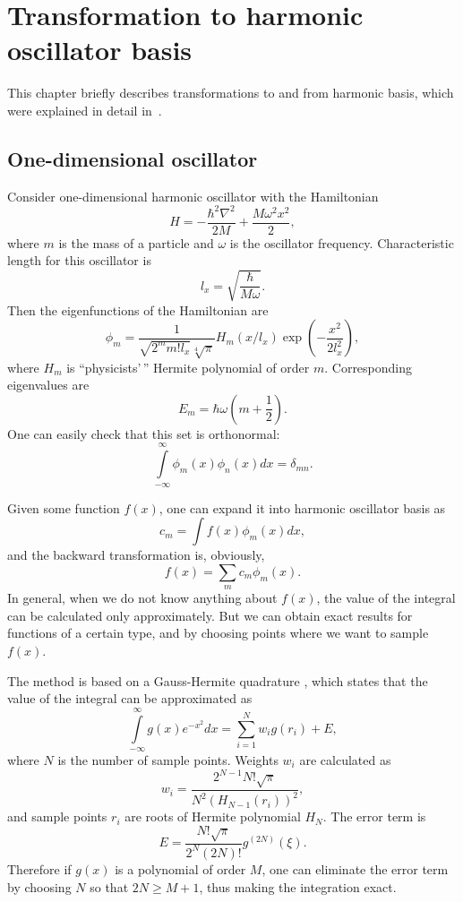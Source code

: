\chapter{Transformation to harmonic oscillator basis}
\label{cha:appendix:harmonic-transform}


This chapter briefly describes transformations to and from harmonic basis,
which were explained in detail in~\cite{Dion2003}.


\section{One-dimensional oscillator}

Consider one-dimensional harmonic oscillator with the Hamiltonian
\[
	H = -\frac{\hbar^2 \nabla^2}{2 M} + \frac{M \omega^2 x^2}{2},
\]
where $m$ is the mass of a particle and $\omega$ is the oscillator frequency.
Characteristic length for this oscillator is
\[
	l_x = \sqrt{\frac{\hbar}{M \omega}}.
\]
Then the eigenfunctions of the Hamiltonian are
\begin{equation}
\label{eqn:harmonic-transform:harmonic-modes}
	\phi_m = \frac{1}{\sqrt{2^m m! l_x} \sqrt[4]{\pi}} H_m(x / l_x)
		\exp \left( -\frac{x^2}{2 l_x^2} \right),
\end{equation}
where $H_m$ is ``physicists'\,'' Hermite polynomial of order $m$.
Corresponding eigenvalues are
\[
	E_m = \hbar \omega (m + \frac{1}{2}).
\]
One can easily check that this set is orthonormal:
\[
	\int\limits_{-\infty}^{\infty} \phi_m(x) \phi_n(x) dx = \delta_{mn}.
\]

Given some function $f(x)$, one can expand it into harmonic oscillator basis as
\[
	c_m = \int f(x) \phi_m(x) dx,
\]
and the backward transformation is, obviously,
\[
	f(x) = \sum_{m} c_m \phi_m(x).
\]
In general, when we do not know anything about $f(x)$,
the value of the integral can be calculated only approximately.
But we can obtain exact results for functions of a certain type,
and by choosing points where we want to sample $f(x)$.

The method is based on a Gauss-Hermite quadrature ,
which states that the value of the integral can be approximated as
\[
	\int\limits_{-\infty}^{\infty} g(x) e^{-x^2} dx
	= \sum_{i=1}^N w_i g(r_i) + E,
\]
where $N$ is the number of sample points.
Weights $w_i$ are calculated as
\[
	w_i = \frac{2^{N-1} N! \sqrt{\pi}}{N^2 (H_{N-1}(r_i))^2},
\]
and sample points $r_i$ are roots of Hermite polynomial $H_N$.
The error term is
\[
	E = \frac{N! \sqrt{\pi}}{2^N (2N)!} g^{(2N)}(\xi).
\]
Therefore if $g(x)$ is a polynomial of order $M$,
one can eliminate the error term by choosing $N$ so that $2N \ge M + 1$,
thus making the integration exact.

